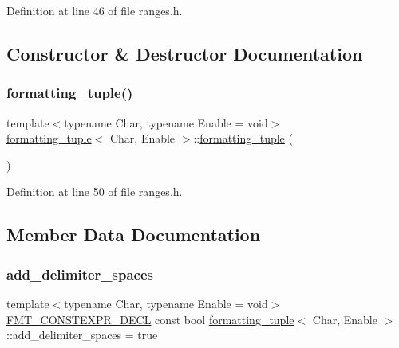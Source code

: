 Definition at line 46 of file ranges.\+h.



\subsection{Constructor \& Destructor Documentation}
\mbox{\label{structformatting__tuple_afe0ff5245dd3f9b567e55b9dd724dba9}} 
\subsubsection{\texorpdfstring{formatting\+\_\+tuple()}{formatting\_tuple()}}
{\footnotesize\ttfamily template$<$typename Char, typename Enable = void$>$ \\
\hyperlink{structformatting__tuple}{formatting\+\_\+tuple}$<$ Char, Enable $>$\+::\hyperlink{structformatting__tuple}{formatting\+\_\+tuple} (\begin{DoxyParamCaption}{ }\end{DoxyParamCaption})\hspace{0.3cm}{\ttfamily [inline]}}



Definition at line 50 of file ranges.\+h.



\subsection{Member Data Documentation}
\mbox{\label{structformatting__tuple_ac37833d9d42f1fe21c2203a8621e71d6}} 
\subsubsection{\texorpdfstring{add\+\_\+delimiter\+\_\+spaces}{add\_delimiter\_spaces}}
{\footnotesize\ttfamily template$<$typename Char, typename Enable = void$>$ \\
\hyperlink{core_8h_af4388801466a5994a363d6005616371a}{F\+M\+T\+\_\+\+C\+O\+N\+S\+T\+E\+X\+P\+R\+\_\+\+D\+E\+CL} const bool \hyperlink{structformatting__tuple}{formatting\+\_\+tuple}$<$ Char, Enable $>$\+::add\+\_\+delimiter\+\_\+spaces = true\hspace{0.3cm}{\ttfamily [static]}}




